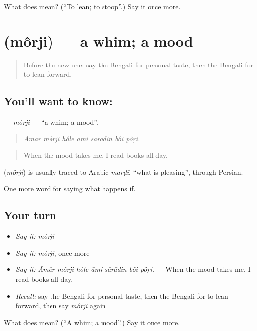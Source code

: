 \begin{tcolorbox}[breakable,colback=teal!4,colframe=teal!35!black,title={Before you move on}]
What does  mean? (\textquotedblleft{}To lean; to stoop\textquotedblright{}.) Say it once more.
\end{tcolorbox}
\section[\texorpdfstring{\bn{মর্জি} (môrji)}{মর্জি (môrji)}]{ (môrji) — a whim; a mood}

\label{lesson:BN-C529-morji}



\begin{quote}
Before the new one: say the Bengali for personal taste, then the Bengali for to lean forward.
\end{quote}

\subsection*{You'll want to know: }
\textbf{} — \emph{môrji} — \textquotedblleft{}a whim; a mood\textquotedblright{}.

\begin{quote}
      
\end{quote}

\begin{quote}
\emph{Āmār môrji hôle āmi sārādin bôi pôṛi.}
\end{quote}

\begin{quote}
When the mood takes me, I read books all day.
\end{quote}

\begin{cousinweb}
\textbf{} (\emph{môrji}) is usually traced to Arabic \emph{marḍī}, \textquotedblleft{}what is pleasing\textquotedblright{}, through Persian.
\end{cousinweb}

\begin{grammarlens}[title={What you've built}]
One more word for saying what happens if.
\end{grammarlens}

\subsection*{Your turn}
\begin{itemize}
\raggedright
  \item \emph{Say it:} \emph{môrji}
  \item \emph{Say it:} \emph{môrji}, once more
  \item \emph{Say it:} \emph{Āmār môrji hôle āmi sārādin bôi pôṛi.} — When the mood takes me, I read books all day.
  \item \emph{Recall:} say the Bengali for personal taste, then the Bengali for to lean forward, then say \emph{môrji} again
\end{itemize}

\begin{tcolorbox}[breakable,colback=teal!4,colframe=teal!35!black,title={Before you move on}]
What does  mean? (\textquotedblleft{}A whim; a mood\textquotedblright{}.) Say it once more.
\end{tcolorbox}
